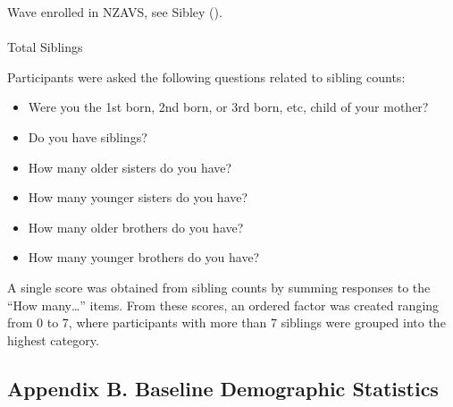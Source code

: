 \documentclass[
  single column]{article}
\makeatletter
\let\oldparagraph\paragraph
\renewcommand{\paragraph}{
    \@ifstar
      \xxxParagraphStar
      \xxxParagraphNoStar
  }
\newcommand{\xxxParagraphStar}[1]{\oldparagraph*{#1}\mbox{}}
\newcommand{\xxxParagraphNoStar}[1]{\oldparagraph{#1}\mbox{}}
\providecommand{\tightlist}{%
  \setlength{\itemsep}{0pt}\setlength{\parskip}{0pt}}\usepackage{longtable,booktabs,array}
\makeatother
\begin{document}
Wave enrolled in NZAVS, see Sibley ().

\paragraph{Total Siblings}\label{total-siblings}

Participants were asked the following questions related to sibling
counts:

\begin{itemize}
\tightlist
\item
  Were you the 1st born, 2nd born, or 3rd born, etc, child of your
  mother?
\item
  Do you have siblings?
\item
  How many older sisters do you have?
\item
  How many younger sisters do you have?
\item
  How many older brothers do you have?
\item
  How many younger brothers do you have?
\end{itemize}

A single score was obtained from sibling counts by summing responses to
the ``How many\ldots{}'' items. From these scores, an ordered factor was
created ranging from 0 to 7, where participants with more than 7
siblings were grouped into the highest category.

\newpage{}

\subsection{Appendix B. Baseline Demographic
Statistics}\label{appendix-demographics}
\end{document}
